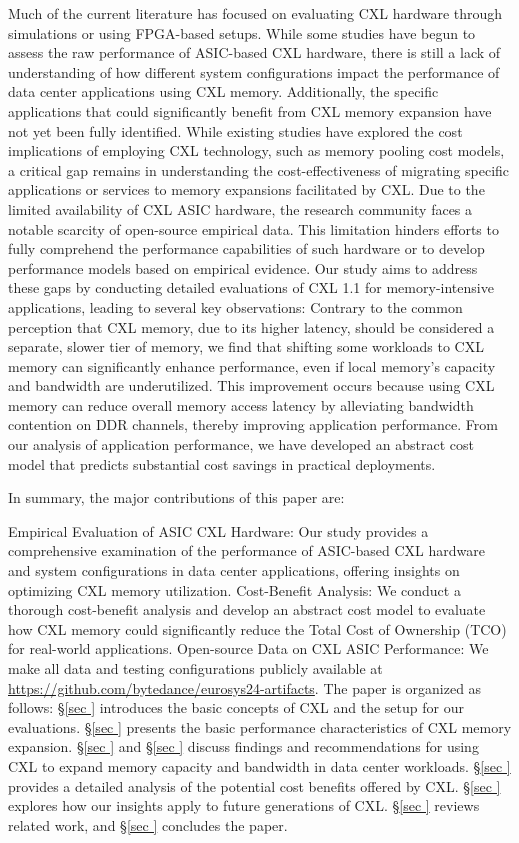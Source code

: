 Much of the current literature has focused on evaluating CXL hardware through simulations or using FPGA-based setups. While some studies have begun to assess the raw performance of ASIC-based CXL hardware, there is still a lack of understanding of how different system configurations impact the performance of data center applications using CXL memory. Additionally, the specific applications that could significantly benefit from CXL memory expansion have not yet been fully identified.
While existing studies have explored the cost implications of employing CXL technology, such as memory pooling cost models, a critical gap remains in understanding the cost-effectiveness of migrating specific applications or services to memory expansions facilitated by CXL.
Due to the limited availability of CXL ASIC hardware, the research community faces a notable scarcity of open-source empirical data. This limitation hinders efforts to fully comprehend the performance capabilities of such hardware or to develop performance models based on empirical evidence.
Our study aims to address these gaps by conducting detailed evaluations of CXL 1.1 for memory-intensive applications, leading to several key observations: Contrary to the common perception that CXL memory, due to its higher latency, should be considered a separate, slower tier of memory, we find that shifting some workloads to CXL memory can significantly enhance performance, even if local memory's capacity and bandwidth are underutilized. This improvement occurs because using CXL memory can reduce overall memory access latency by alleviating bandwidth contention on DDR channels, thereby improving application performance. From our analysis of application performance, we have developed an abstract cost model that predicts substantial cost savings in practical deployments.

In summary, the major contributions of this paper are:

Empirical Evaluation of ASIC CXL Hardware: Our study provides a comprehensive examination of the performance of ASIC-based CXL hardware and system configurations in data center applications, offering insights on optimizing CXL memory utilization.
Cost-Benefit Analysis: We conduct a thorough cost-benefit analysis and develop an abstract cost model to evaluate how CXL memory could significantly reduce the Total Cost of Ownership (TCO) for real-world applications.
Open-source Data on CXL ASIC Performance: We make all data and testing configurations publicly available at \url{https://github.com/bytedance/eurosys24-artifacts}.
The paper is organized as follows: \S\ref{sec
} introduces the basic concepts of CXL and the setup for our evaluations. \S\ref{sec
} presents the basic performance characteristics of CXL memory expansion. \S\ref{sec
} and \S\ref{sec
} discuss findings and recommendations for using CXL to expand memory capacity and bandwidth in data center workloads. \S\ref{sec
} provides a detailed analysis of the potential cost benefits offered by CXL. \S\ref{sec
} explores how our insights apply to future generations of CXL. \S\ref{sec
} reviews related work, and \S\ref{sec
} concludes the paper.







